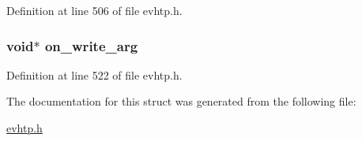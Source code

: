 Definition at line 506 of file evhtp.\-h.

\hypertarget{structevhtp__hooks__s_a9aa579b8a735219a73e5e37c390a9580}{
\subsubsection[{on\-\_\-write\-\_\-arg}]{\setlength{\rightskip}{0pt plus 5cm}void$\ast$ on\-\_\-write\-\_\-arg}}\label{structevhtp__hooks__s_a9aa579b8a735219a73e5e37c390a9580}


Definition at line 522 of file evhtp.\-h.



The documentation for this struct was generated from the following file\-:\begin{DoxyCompactItemize}
\item 
\hyperlink{evhtp_8h}{evhtp.\-h}\end{DoxyCompactItemize}
